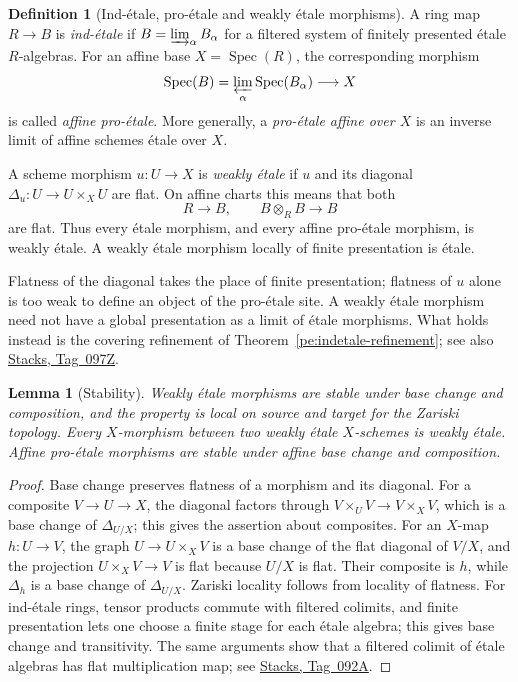 \documentclass[11pt,a4paper]{article}
\numberwithin{equation}{section}
\newtheorem{lemma}[theorem]{Lemma}
\theoremstyle{definition}
\newtheorem{definition}[theorem]{Definition}
\theoremstyle{remark}
\newcommand{\stacks}[1]{\href{https://stacks.math.columbia.edu/tag/#1}{\textnormal{Stacks, Tag~#1}}}
\begin{document}
\begin{definition}[Ind-\'etale, pro-\'etale and weakly \'etale morphisms]
\label{pe:morphisms}
A ring map $R\to B$ is \emph{ind-\'etale} if
$B=\varinjlim_\alpha B_\alpha$ for a filtered system of finitely
presented \'etale $R$-algebras. For an affine base
$X=\operatorname{Spec}(R)$, the corresponding morphism
\[
 \operatorname{Spec}(B)=\varprojlim_\alpha
 \operatorname{Spec}(B_\alpha)\longrightarrow X
\]
is called \emph{affine pro-\'etale}. More generally, a
\emph{pro-\'etale affine over $X$} is an inverse limit of affine
schemes \'etale over $X$.

A scheme morphism $u:U\to X$ is \emph{weakly \'etale} if $u$ and its
diagonal $\Delta_u:U\to U\times_XU$ are flat. On affine charts this
means that both
\[
 R\longrightarrow B,
 \qquad B\otimes_RB\longrightarrow B
\]
are flat. Thus every \'etale morphism, and every affine pro-\'etale
morphism, is weakly \'etale. A weakly \'etale morphism locally of finite
presentation is \'etale.
\end{definition}

Flatness of the diagonal takes the place of finite presentation; flatness
of $u$ alone is too weak to define an object of the pro-\'etale site.
A weakly \'etale morphism need not have a global presentation as a
limit of \'etale morphisms. What holds instead is the covering
refinement of Theorem~\ref{pe:indetale-refinement}; see also
\stacks{097Z}.

\begin{lemma}[Stability]
\label{pe:weakly-etale-stability}
Weakly \'etale morphisms are stable under base change and composition,
and the property is local on source and target for the Zariski topology.
Every $X$-morphism between two weakly \'etale $X$-schemes is weakly
\'etale. Affine pro-\'etale morphisms are stable under affine base
change and composition.
\end{lemma}
\begin{proof}
Base change preserves flatness of a morphism and its diagonal. For a
composite $V\to U\to X$, the diagonal factors through
$V\times_UV\to V\times_XV$, which is a base change of
$\Delta_{U/X}$; this gives the assertion about composites.
For an $X$-map $h:U\to V$, the graph
$U\to U\times_XV$ is a base change of the flat diagonal of $V/X$, and
the projection $U\times_XV\to V$ is flat because $U/X$ is flat.
Their composite is $h$, while $\Delta_h$ is a base change of
$\Delta_{U/X}$. Zariski locality follows from locality of flatness.
For ind-\'etale rings, tensor products commute with filtered colimits,
and finite presentation lets one choose a finite stage for each
\'etale algebra; this gives base change and transitivity. The same
arguments show that a filtered colimit of \'etale algebras has flat
multiplication map; see \stacks{092A}.
\end{proof}
\end{document}
